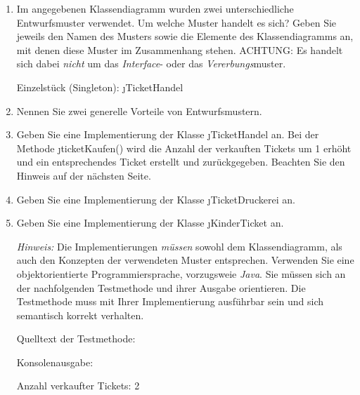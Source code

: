 \documentclass{lehramt-informatik-aufgabe}
\begin{document}
\begin{enumerate}


\item Im angegebenen Klassendiagramm wurden zwei unterschiedliche
Entwurfsmuster verwendet. Um welche Muster handelt es sich? Geben Sie
jeweils den Namen des Musters sowie die Elemente des Klassendiagramms
an, mit denen diese Muster im Zusammenhang stehen. ACHTUNG: Es handelt
sich dabei \emph{nicht} um das \emph{Interface}- oder das
\emph{Vererbungs}muster.

\begin{liAntwort}
Einzelstück (Singleton): \j{TicketHandel}
\end{liAntwort}


\item Nennen Sie zwei generelle Vorteile von Entwurfsmustern.


\item Geben Sie eine Implementierung der Klasse \j{TicketHandel} an. Bei
der Methode \j{ticketKaufen()} wird die Anzahl der verkauften Tickets um
1 erhöht und ein entsprechendes Ticket erstellt und zurückgegeben.
Beachten Sie den Hinweis auf der nächsten Seite.


\item Geben Sie eine Implementierung der Klasse \j{TicketDruckerei} an.


\item Geben Sie eine Implementierung der Klasse \j{KinderTicket} an.

\emph{Hinweis:} Die Implementierungen \emph{müssen} sowohl dem
Klassendiagramm, als auch den Konzepten der verwendeten Muster
entsprechen. Verwenden Sie eine objektorientierte Programmiersprache,
vorzugsweie \emph{Java}. Sie müssen sich an der nachfolgenden
Testmethode und ihrer Ausgabe orientieren. Die Testmethode muss mit
Ihrer Implementierung ausführbar sein und sich semantisch korrekt
verhalten.

Quelltext der Testmethode:



Konsolenausgabe:

Anzahl verkaufter Tickets: 2
\end{enumerate}
\end{document}
